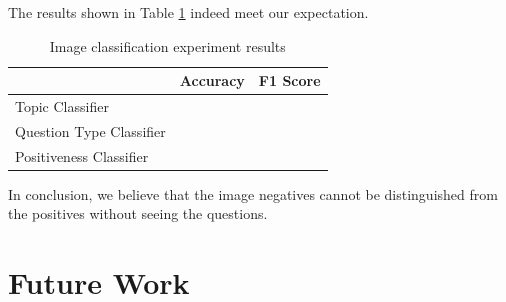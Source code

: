 \documentclass[nohyperref]{article}
\theoremstyle{plain}
\theoremstyle{definition}
\theoremstyle{remark}
\begin{document}
    The results shown in Table \ref{tab:image_classification_results} indeed meet our expectation.
    \begin{table}[h]
        \centering
        \footnotesize
        \begin{tabular}{lll}
            & Accuracy & F1 Score \\
            \toprule
            Topic Classifier         &          &          \\
            \midrule
            Question Type Classifier &          &          \\
            \midrule
            Positiveness Classifier  &          &          \\
            \bottomrule
        \end{tabular}
        \caption{Image classification experiment results}
        \label{tab:image_classification_results}
        \vspace{-5pt}
    \end{table}

    In conclusion, we believe that the image negatives cannot be distinguished from the positives without seeing the
    questions.


    \section{Future Work}

    \clearpage

    
    
\end{document}
